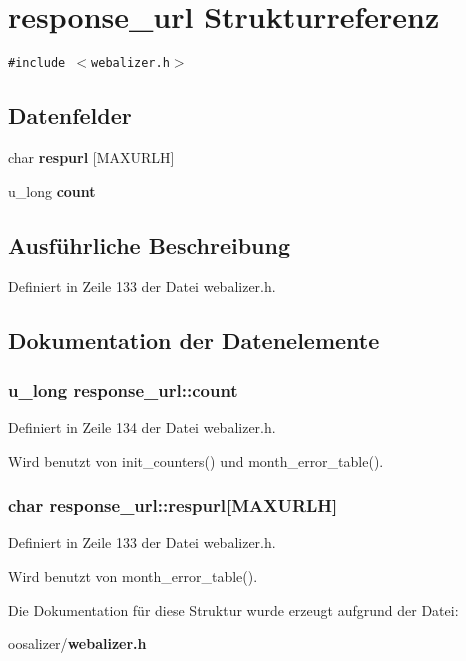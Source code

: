 \section{response\_\-url Strukturreferenz}
\label{structresponse__url}
{\tt \#include $<$webalizer.h$>$}

\subsection*{Datenfelder}
\begin{CompactItemize}
\item 
char {\bf respurl} [MAXURLH]
\item 
u\_\-long {\bf count}
\end{CompactItemize}


\subsection{Ausf\"{u}hrliche Beschreibung}




Definiert in Zeile 133 der Datei webalizer.h.

\subsection{Dokumentation der Datenelemente}
\subsubsection{\setlength{\rightskip}{0pt plus 5cm}u\_\-long {\bf response\_\-url::count}}\label{structresponse__url_82f3189f3b02c8eb1edc0f0da8ceb0e7}




Definiert in Zeile 134 der Datei webalizer.h.

Wird benutzt von init\_\-counters() und month\_\-error\_\-table().
\subsubsection{\setlength{\rightskip}{0pt plus 5cm}char {\bf response\_\-url::respurl}[MAXURLH]}\label{structresponse__url_c997088a7965d5b69b6aec48f77deea6}




Definiert in Zeile 133 der Datei webalizer.h.

Wird benutzt von month\_\-error\_\-table().

Die Dokumentation f\"{u}r diese Struktur wurde erzeugt aufgrund der Datei:\begin{CompactItemize}
\item 
oosalizer/{\bf webalizer.h}\end{CompactItemize}
